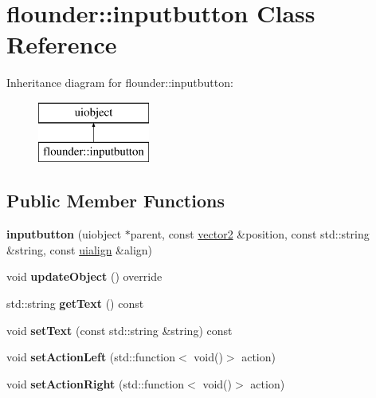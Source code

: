 \hypertarget{classflounder_1_1inputbutton}{}\section{flounder\+:\+:inputbutton Class Reference}
\label{classflounder_1_1inputbutton}
Inheritance diagram for flounder\+:\+:inputbutton\+:\begin{figure}[H]
\begin{center}
\leavevmode
\includegraphics[height=2.000000cm]{classflounder_1_1inputbutton}
\end{center}
\end{figure}
\subsection*{Public Member Functions}
\begin{DoxyCompactItemize}
\item 
\mbox{\label{classflounder_1_1inputbutton_a0f4deb8776c214858514e95578ca81c1}} 
{\bfseries inputbutton} (uiobject $\ast$parent, const \hyperlink{classflounder_1_1vector2}{vector2} \&position, const std\+::string \&string, const \hyperlink{namespaceflounder_a70f1871d5c05aa8e078dd37501ce10a9}{uialign} \&align)
\item 
\mbox{\label{classflounder_1_1inputbutton_a8116aa642d04121dbebac91d0b074a96}} 
void {\bfseries update\+Object} () override
\item 
\mbox{\label{classflounder_1_1inputbutton_a4ab362aa91ad5620d209174861c2306c}} 
std\+::string {\bfseries get\+Text} () const
\item 
\mbox{\label{classflounder_1_1inputbutton_a1e7486b709c56a10c377576080b951c2}} 
void {\bfseries set\+Text} (const std\+::string \&string) const
\item 
\mbox{\label{classflounder_1_1inputbutton_a4cd73cfe3de3f2bc738659986cdf66d8}} 
void {\bfseries set\+Action\+Left} (std\+::function$<$ void()$>$ action)
\item 
\mbox{\label{classflounder_1_1inputbutton_aa628f6d6413883b27dc8fd05275602c0}} 
void {\bfseries set\+Action\+Right} (std\+::function$<$ void()$>$ action)
\end{DoxyCompactItemize}
